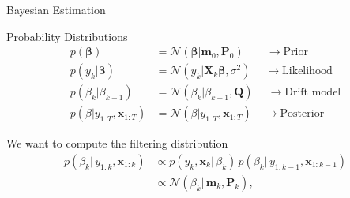 \documentclass[navbarinfooter, 12pt]{sdqbeamer}
\begin{document}
\begin{frame}{Bayesian Estimation}
  \begin{block}{Probability Distributions}
    \begin{align*}
      p(\mathbf{\beta}) &= \mathcal{N}(\mathbf{\beta} | \textbf{m}_0, \textbf{P}_0)
      \, \; \; \; \quad \rightarrow \text{Prior} \\
      p(y_k | \mathbf{\beta}) &= \mathcal{N}(y_k | \textbf{X}_k \mathbf{\beta}, \sigma^2)
                                \;   \quad \rightarrow  \text{Likelihood} \\
      p(\beta_k | \beta_{k-1})
                        &=
                          \mathcal{N}(\beta_k | \beta_{k-1}, \textbf{Q}) \quad
                          \; \rightarrow \text{Drift model} \\      
      p(\beta | y_{1:T}, \mathbf{x}_{1:T}) &= \mathcal{N}(\beta | y_{1:T}, \mathbf{x}_{1:T}) \quad  \rightarrow \text{Posterior} 
    \end{align*}
  \end{block}
  We want to compute the filtering distribution
  \begin{align*}
    p(\beta_k | \, y_{1:k}, \mathbf{x}_{1:k})
    &\propto p(y_k, \mathbf{x}_k | \, \beta_k) \,
      p(\beta_k |\, y_{1:k-1}, \mathbf{x}_{1:k-1}) \\
    &\propto \mathcal{N}(\beta_k | \, \mathbf{m}_k, \mathbf{P}_k),
  \end{align*}

\end{frame}

%
\end{document}
